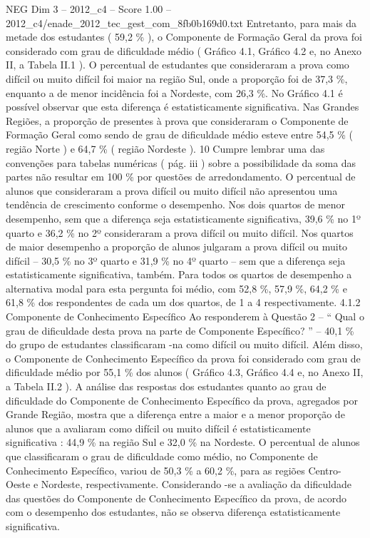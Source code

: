 \begin{textsample}{NEG Dim 3 – 2012\_c4 – Score 1.00 – 2012\_c4/enade\_2012\_tec\_gest\_com\_8fb0b169d0.txt}
Entretanto, para mais da metade dos estudantes ( 59,2 \% ), o Componente de Formação Geral da prova foi considerado com grau de dificuldade médio ( Gráfico 4.1, Gráfico 4.2 e, no Anexo II, a Tabela II.1 ).
O percentual de estudantes que consideraram a prova como difícil ou muito difícil foi maior na região Sul, onde a proporção foi de 37,3 \%, enquanto a de menor incidência foi a Nordeste, com 26,3 \%.
No Gráfico 4.1 é possível observar que esta diferença é estatisticamente significativa.
Nas Grandes Regiões, a proporção de presentes à prova que consideraram o Componente de Formação Geral como sendo de grau de dificuldade médio esteve entre 54,5 \% ( região Norte ) e 64,7 \% ( região Nordeste ). 10 Cumpre lembrar uma das convenções para tabelas numéricas ( pág. iii ) sobre a possibilidade da soma das partes não resultar em 100 \% por questões de arredondamento.
O percentual de alunos que consideraram a prova difícil ou muito difícil não apresentou uma tendência de crescimento conforme o desempenho.
Nos dois quartos de menor desempenho, sem que a diferença seja estatisticamente significativa, 39,6 \% no 1º quarto e 36,2 \% no 2º consideraram a prova difícil ou muito difícil.
Nos quartos de maior desempenho a proporção de alunos julgaram a prova difícil ou muito difícil – 30,5 \% no 3º quarto e 31,9 \% no 4º quarto – sem que a diferença seja estatisticamente significativa, também.
Para todos os quartos de desempenho a alternativa modal para esta pergunta foi médio, com 52,8 \%, 57,9 \%, 64,2 \% e 61,8 \% dos respondentes de cada um dos quartos, de 1 a 4 respectivamente. 4.1.2 Componente de Conhecimento Específico Ao responderem à Questão 2 – “ Qual o grau de dificuldade desta prova na parte de Componente Específico? ” – 40,1 \% do grupo de estudantes classificaram -na como difícil ou muito difícil.
Além disso, o Componente de Conhecimento Específico da prova foi considerado com grau de dificuldade médio por 55,1 \% dos alunos ( Gráfico 4.3, Gráfico 4.4 e, no Anexo II, a Tabela II.2 ).
A análise das respostas dos estudantes quanto ao grau de dificuldade do Componente de Conhecimento Específico da prova, agregados por Grande Região, mostra que a diferença entre a maior e a menor proporção de alunos que a avaliaram como difícil ou muito difícil é estatisticamente significativa : 44,9 \% na região Sul e 32,0 \% na Nordeste.
O percentual de alunos que classificaram o grau de dificuldade como médio, no Componente de Conhecimento Específico, variou de 50,3 \% a 60,2 \%, para as regiões Centro-Oeste e Nordeste, respectivamente.
Considerando -se a avaliação da dificuldade das questões do Componente de Conhecimento Específico da prova, de acordo com o desempenho dos estudantes, não se observa diferença estatisticamente significativa.

\end{textsample}
